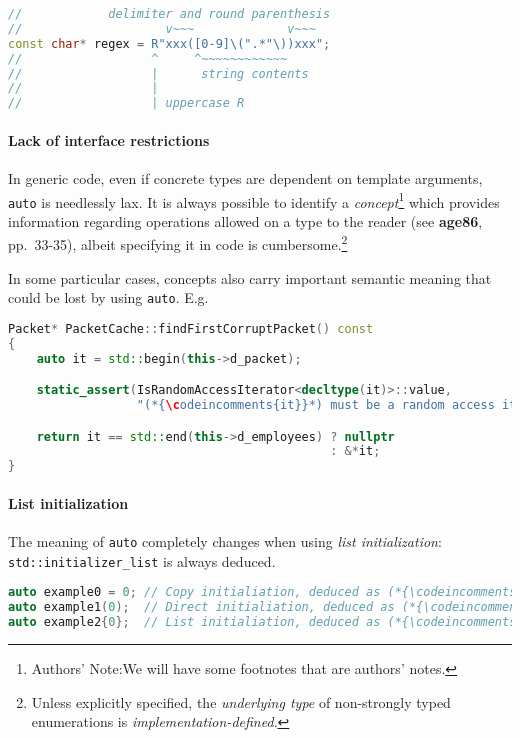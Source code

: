 \documentclass[twoside,10pt,letterpaper,usenames]{newstyle-PearsonGeneric-7-38}
\newcommand{\codeincomments}{\color{skyblue}\ttfamily}
\newcommand{\authorsnote}{Authors' Note:}
\begin{document}
\begin{lstlisting}[language=C++]
//            delimiter and round parenthesis
//                    v~~~             v~~~
const char* regex = R"xxx([0-9]\(".*"\))xxx";
//                  ^     ^~~~~~~~~~~~~
//                  |      string contents
//                  |
//                  | uppercase R
\end{lstlisting}
    

\paragraph[Lack of interface restrictions]{Lack of interface restrictions}\label{lack-of-interface-restrictions}

In generic code, even if concrete types are dependent on template
arguments, \texttt{auto} is needlessly lax. It is always possible to
identify a \emph{concept}{\cprotect\footnote{\authorsnote We will have
some footnotes that are authors' notes.}} which provides information
regarding operations allowed on a type to the reader (see
\textbf{{age86}}, pp.~33-35), albeit specifying it in code is
cumbersome.{\cprotect\footnote{Unless explicitly specified, the
\emph{underlying type} of non-strongly typed enumerations is
\emph{implementation-defined}.}}

In some particular cases, concepts also carry important semantic meaning
that could be lost by using \texttt{auto}. E.g.

\begin{lstlisting}[language=C++]
Packet* PacketCache::findFirstCorruptPacket() const
{
    auto it = std::begin(this->d_packet);

    static_assert(IsRandomAccessIterator<decltype(it)>::value,
                  "(*{\codeincomments{it}}*) must be a random access iterator.");

    return it == std::end(this->d_employees) ? nullptr
                                             : &*it;
}
\end{lstlisting}
    

\paragraph[List initialization]{List initialization}\label{list-initialization}

The meaning of \texttt{auto} completely changes when using \emph{list
initialization}: \texttt{std::initializer\_list} is always deduced.

\begin{lstlisting}[language=C++]
auto example0 = 0; // Copy initialiation, deduced as (*{\codeincomments{int}}*).
auto example1(0);  // Direct initialiation, deduced as (*{\codeincomments{int}}*).
auto example2{0};  // List initialiation, deduced as (*{\codeincomments{std::initializer\_list<int>}}*).
\end{lstlisting}
    
\end{document}
